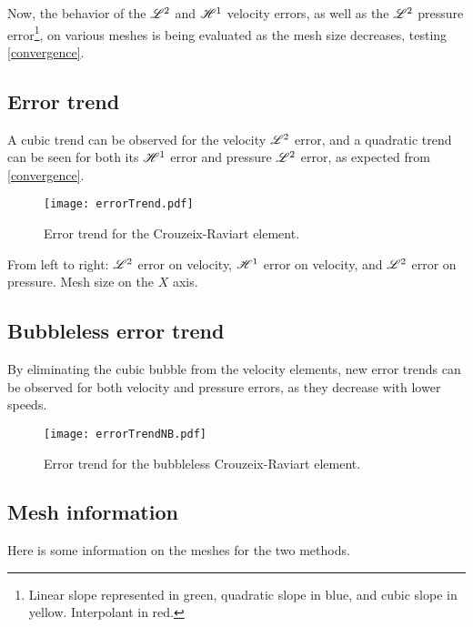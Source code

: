 Now, the behavior of the $\mathscr{L}^2$ and $\mathscr{H}^1$ velocity errors, as well as the $\mathscr{L}^2$ pressure error\footnote{Linear slope represented in \textcolor{solarized-green}{green}, quadratic slope in \textcolor{solarized-blue}{blue}, and cubic slope in \textcolor{solarized-yellow}{yellow}. Interpolant in \textcolor{solarized-red}{red}.}, on various meshes is being evaluated as the mesh size decreases, testing \ref{convergence}.

\subsection{Error trend}

A cubic trend can be observed for the velocity $\mathscr{L}^2$ error, and a quadratic trend can be seen for both its $\mathscr{H}^1$ error and pressure $\mathscr{L}^2$ error, as expected from \ref{convergence}.

\begin{figure}[!ht]
	\centering
	\texttt{[image: errorTrend.pdf]}
	\caption{Error trend for the Crouzeix-Raviart element.}
\end{figure}

From left to right: $\mathscr{L}^2$ error on velocity, $\mathscr{H}^1$ error on velocity, and $\mathscr{L}^2$ error on pressure. Mesh size on the $X$ axis.

\newpage
\subsection{Bubbleless error trend}

By eliminating the cubic bubble from the velocity elements, new error trends can be observed for both velocity and pressure errors, as they decrease with lower speeds.

\begin{figure}[!ht]
	\centering
	\texttt{[image: errorTrendNB.pdf]}
	\caption{Error trend for the bubbleless Crouzeix-Raviart element.}
\end{figure}

\newpage
\subsection{Mesh information}

Here is some information on the meshes for the two methods.

\begin{multicols}{2}
	
	
\end{multicols}

